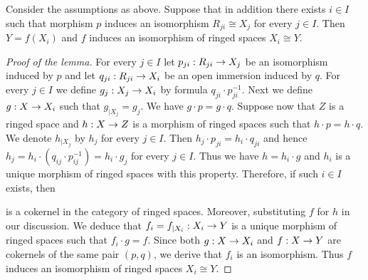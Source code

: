 \begin{lemma}\label{lemma:isomorphismforoneindex}
Consider the assumptions as above. Suppose that in addition there exists $i\in I$ such that morphism $p$ induces an isomorphism $R_{ji}\cong X_j$ for every $j\in I$. Then $Y = f(X_i)$ and $f$ induces an isomorphism of ringed spaces $X_i\cong Y$. 
\end{lemma}
\begin{proof}[Proof of the lemma]
For every $j\in I$ let $p_{ji}:R_{ji}\rightarrow X_j$ be an isomorphism induced by $p$ and let $q_{ji}:R_{ji}\rightarrow X_i$ be an open immersion induced by $q$. For every $j\in I$ we define $g_j:X_j\rightarrow X_i$ by formula $q_{ji}\cdot p_{ji}^{-1}$. Next we define $g:X\rightarrow X_i$ such that $g_{\mid X_j} = g_j$. We have $g\cdot p = g\cdot q$. Suppose now that $Z$ is a ringed space and $h:X\rightarrow Z$ is a morphism of ringed spaces such that $h\cdot p = h\cdot q$. We denote $h_{\mid X_j}$ by $h_j$ for every $j\in I$. Then $h_j \cdot p_{ji} = h_i\cdot q_{ji}$ and hence
$h_j = h_i\cdot (q_{ij}\cdot p_{ij}^{-1}) = h_i\cdot g_j$ for every $j\in I$. Thus we have $h = h_i\cdot g$ and $h_i$ is a unique morphism of ringed spaces with this property. Therefore, if such $i\in I$ exists, then
\begin{center}
\end{center}
is a cokernel in the category of ringed spaces. Moreover, substituting $f$ for $h$ in our discussion. We deduce that $f_i = f_{\mid X_i}:X_i\rightarrow Y$ is a unique morphism of ringed spaces such that $f_i \cdot g = f$. Since both $g:X\rightarrow X_i$ and $f:X\rightarrow Y$ are cokernels of the same pair $(p,q)$, we derive that $f_i$ is an isomorphism. Thus $f$ induces an isomorphism of ringed spaces $X_i\cong Y$.
\end{proof}

